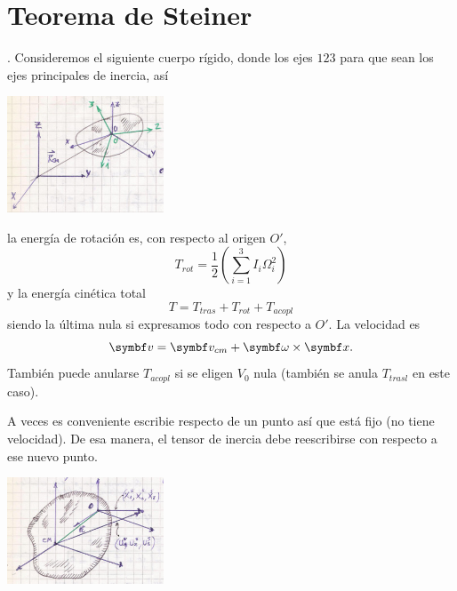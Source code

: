 \documentclass[10pt,oneside]{CBFT_book}
\begin{document}
\section{Teorema de Steiner}
.
Consideremos el siguiente cuerpo rígido, donde los ejes $123$ para que sean los ejes principales de inercia, así

\includegraphics[width=0.35\textwidth]{images/fig_mc_steiner_1.jpg}

la energía de rotación es, con respecto al origen $O'$, 
\[
	T_{rot} = \frac 1 2 ( \sum_{i=1}^3 I_i \Omega_i^2 )
\]
y la energía cinética total 
\[
	T = T_{tras} + T_{rot} + T_{acopl}
\]
siendo la última nula si expresamos todo con respecto a $O'$. La velocidad es 
\[
	\vb{v} = \vb{v}_{cm} + \vb{\omega} \times \vb{x}.
\]
También puede anularse $T_{acopl}$ si se eligen $V_0$ nula (también se anula $T_{trasl}$ en este caso).

A veces es conveniente escribie respecto de un punto así que está fijo (no tiene velocidad). De esa manera, el tensor 
de inercia debe reescribirse con respecto a ese nuevo punto.

\includegraphics[width=0.35\textwidth]{images/fig_mc_steiner_2.jpg}
\end{document}
